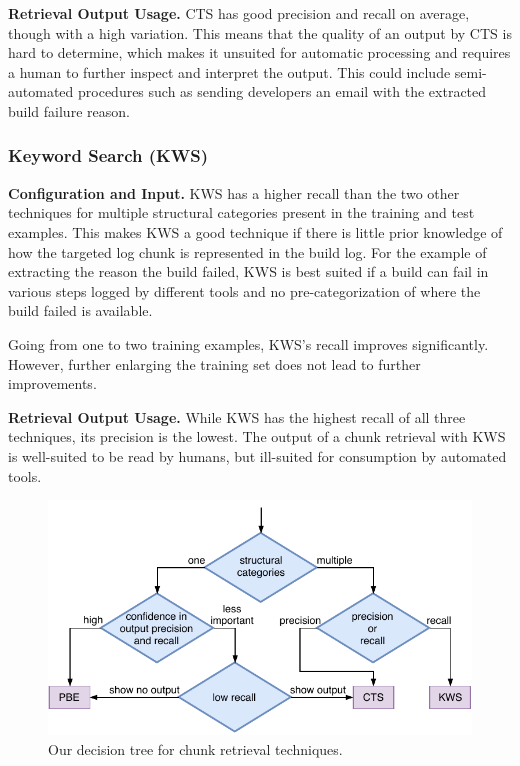 \noindent
\textbf{Retrieval Output Usage.}
CTS has good precision and recall on average, though with a high
variation.
This means that the quality of an output by CTS is hard to
determine, which makes it unsuited for automatic processing and requires
a human to further inspect and interpret the output.
This could include semi-automated procedures such as sending
developers an email with the extracted build failure reason.

\subsubsection{Keyword Search (KWS)}
\noindent
\textbf{Configuration and Input.}
KWS has a higher recall than the two other techniques for multiple
structural categories present in the training and test examples.
This
makes KWS a good technique if there is little prior knowledge of how
the targeted log chunk is represented in the build log.
For the
example of extracting the reason the build failed, KWS is best suited
if a build can fail in various steps logged by different tools and no
pre-categorization of where the build failed is available.

Going from one to two training examples, KWS's recall improves
significantly.
However, further enlarging the training set
does not lead to further improvements.

\noindent
\textbf{Retrieval Output Usage.}
While KWS has the highest recall of all three techniques, its
precision is the lowest.
The output of a chunk retrieval with KWS is
well-suited to be read by humans, but ill-suited for consumption by
automated tools.

\begin{figure}[tb]
		\centering
		\includegraphics[width=\columnwidth,
		clip]{img/crt-recommendation.pdf}
		\caption{Our decision tree for chunk
		retrieval techniques.}
		\label{fig:crt-recommendation}
\end{figure}

